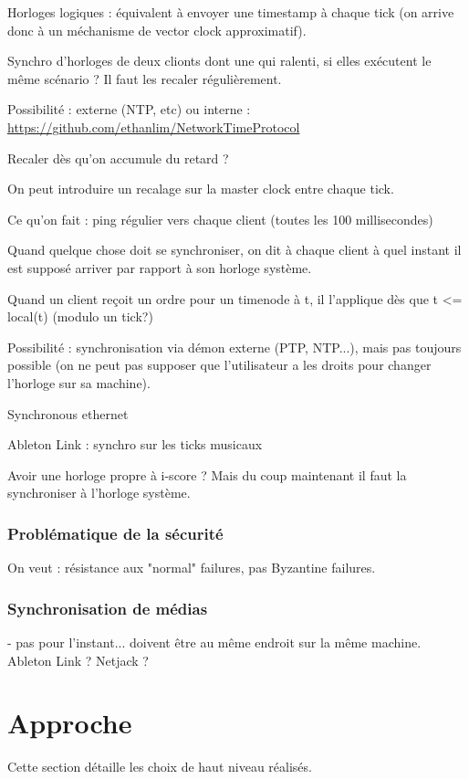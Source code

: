 \documentclass{article}
\begin{document}
Horloges logiques : équivalent à envoyer une timestamp à chaque tick (on arrive donc à un méchanisme de vector clock approximatif). 

Synchro d'horloges de deux clionts dont une qui ralenti, si elles exécutent le même 
scénario ? Il faut les recaler régulièrement. 

Possibilité : externe (NTP, etc) ou interne : \url{https://github.com/ethanlim/NetworkTimeProtocol}

Recaler dès qu'on accumule du retard ?



On peut introduire un recalage sur la master clock entre chaque tick.

Ce qu'on fait : ping régulier vers chaque client (toutes les 100 millisecondes)

Quand quelque chose doit se synchroniser, on dit à chaque client à quel instant il est supposé arriver par rapport à son horloge système.

Quand un client reçoit un ordre pour un timenode à t, il l'applique dès que t <= local(t) (modulo un tick?)



Possibilité : synchronisation via démon externe (PTP, NTP...), mais pas toujours possible (on ne peut pas supposer que l'utilisateur a les droits pour changer l'horloge sur sa machine).

Synchronous ethernet

Ableton Link : synchro sur les ticks musicaux 

Avoir une horloge propre à i-score ? Mais du coup maintenant il faut la synchroniser à l'horloge système. 

\subsubsection{Problématique de la sécurité}
On veut : résistance aux "normal" failures, pas Byzantine failures.

\subsubsection{Synchronisation de médias}
- pas pour l'instant... doivent être au même endroit sur la même machine.
Ableton Link ? Netjack ?

\section{Approche}
Cette section détaille les choix de haut niveau réalisés.
\end{document}
